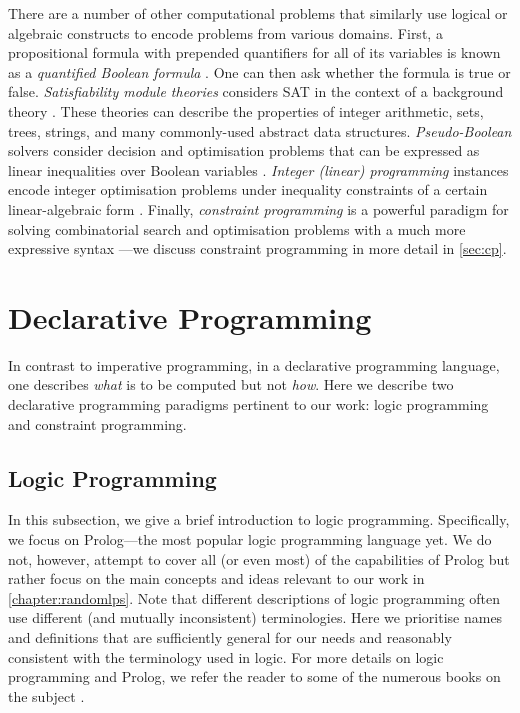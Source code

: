 There are a number of other computational problems that similarly use logical or
algebraic constructs to encode problems from various domains. First, a
propositional formula with prepended quantifiers for all of its variables is
known as a \emph{quantified Boolean formula} \citep{DBLP:series/faia/BuningB09}.
One can then ask whether the formula is true or false. \emph{Satisfiability
  module theories} considers SAT in the context of a background theory
\citep{DBLP:series/faia/BarrettSST09}. These theories can describe the
properties of integer arithmetic, sets, trees, strings, and many commonly-used
abstract data structures. \emph{Pseudo-Boolean} solvers consider decision and
optimisation problems that can be expressed as linear inequalities over Boolean
variables \citep{DBLP:series/faia/RousselM09}. \emph{Integer (linear)
  programming} instances encode integer optimisation problems under inequality
constraints of a certain linear-algebraic form \citep{wolsey2020integer}.
Finally, \emph{constraint programming} is a powerful paradigm for solving
combinatorial search and optimisation problems with a much more expressive
syntax \citep{DBLP:reference/fai/2}---we discuss constraint programming in more
detail in \cref{sec:cp}.

\section{Declarative Programming}\label{sec:declarative}

In contrast to imperative programming, in a declarative programming language,
one describes \emph{what} is to be computed but not \emph{how}. Here we describe
two declarative programming paradigms pertinent to our work: logic programming
and constraint programming.

\subsection{Logic Programming}\label{sec:lp}

In this subsection, we give a brief introduction to logic programming.
Specifically, we focus on Prolog---the most popular logic programming language
yet. We do not, however, attempt to cover all (or even most) of the capabilities
of Prolog but rather focus on the main concepts and ideas relevant to our work
in \cref{chapter:randomlps}. Note that different descriptions of logic
programming often use different (and mutually inconsistent) terminologies. Here
we prioritise names and definitions that are sufficiently general for our needs
and reasonably consistent with the terminology used in logic. For more details
on logic programming and Prolog, we refer the reader to some of the numerous
books on the subject
\citep{DBLP:books/daglib/0041598,DBLP:books/daglib/0067951}.

